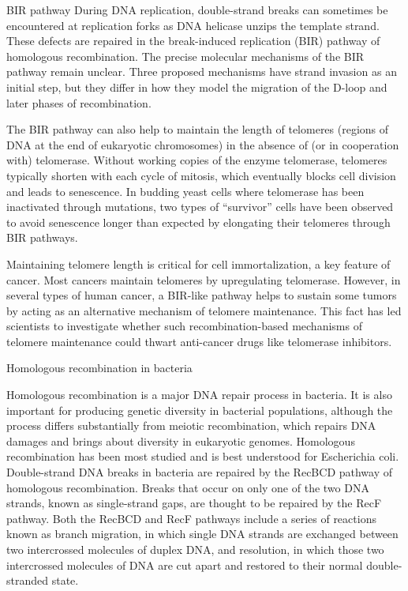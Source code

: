 BIR pathway
During DNA replication, double-strand breaks can sometimes be encountered at replication forks as DNA helicase unzips the template strand. These defects are repaired in the break-induced replication (BIR) pathway of homologous recombination. The precise molecular mechanisms of the BIR pathway remain unclear. Three proposed mechanisms have strand invasion as an initial step, but they differ in how they model the migration of the D-loop and later phases of recombination.

The BIR pathway can also help to maintain the length of telomeres (regions of DNA at the end of eukaryotic chromosomes) in the absence of (or in cooperation with) telomerase. Without working copies of the enzyme telomerase, telomeres typically shorten with each cycle of mitosis, which eventually blocks cell division and leads to senescence. In budding yeast cells where telomerase has been inactivated through mutations, two types of ``survivor'' cells have been observed to avoid senescence longer than expected by elongating their telomeres through BIR pathways.

Maintaining telomere length is critical for cell immortalization, a key feature of cancer. Most cancers maintain telomeres by upregulating telomerase. However, in several types of human cancer, a BIR-like pathway helps to sustain some tumors by acting as an alternative mechanism of telomere maintenance. This fact has led scientists to investigate whether such recombination-based mechanisms of telomere maintenance could thwart anti-cancer drugs like telomerase inhibitors.

Homologous recombination in bacteria

Homologous recombination is a major DNA repair process in bacteria. It is also important for producing genetic diversity in bacterial populations, although the process differs substantially from meiotic recombination, which repairs DNA damages and brings about diversity in eukaryotic genomes. Homologous recombination has been most studied and is best understood for Escherichia coli. Double-strand DNA breaks in bacteria are repaired by the RecBCD pathway of homologous recombination. Breaks that occur on only one of the two DNA strands, known as single-strand gaps, are thought to be repaired by the RecF pathway. Both the RecBCD and RecF pathways include a series of reactions known as branch migration, in which single DNA strands are exchanged between two intercrossed molecules of duplex DNA, and resolution, in which those two intercrossed molecules of DNA are cut apart and restored to their normal double-stranded state.


